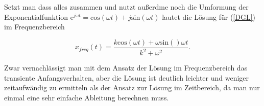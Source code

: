 Setzt man dass alles zusammen und nutzt außerdme noch die Umformung der Exponentialfunktion $\mathrm{e}^{j\omega t} = \mathrm{cos}(\omega t) + j\mathrm{sin}(\omega t)$ lautet die Lösung für (\ref{DGL}) im Frequenzbereich

\begin{equation*}
	x_{freq} (t) = \frac{k\mathrm{cos}(\omega t) + \omega\mathrm{sin}()\omega t}{k^2+ \omega^2}.
\end{equation*}

Zwar vernachlässigt man mit dem Ansatz der Lösung im Frequenzbereich das transiente Anfangsverhalten, aber die Lösung ist deutlich leichter und weniger zeitaufwändig zu ermitteln als der Ansatz zur Lösung im Zeitbereich, da man nur einmal eine sehr einfache Ableitung berechnen muss.



